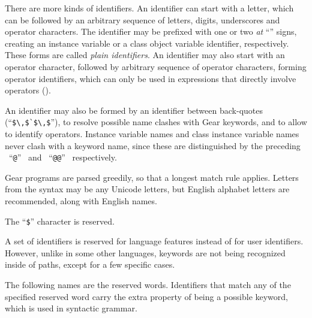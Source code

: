 There are more kinds of identifiers. An identifier can start with a letter, which can be followed by an arbitrary sequence of letters, digits, underscores and operator characters. The identifier may be prefixed with one or two {\em at} ``'' signs, creating an instance variable or a class object variable identifier, respectively. These forms are called {\em plain identifiers}. An identifier may also start with an operator character, followed by arbitrary sequence of operator characters, forming operator identifiers, which can only be used in expressions that directly involve operators (). 

An identifier may also be formed by an identifier between back-quotes (``\lstinline!$\,$`$\,$!''), to resolve possible name clashes with Gear keywords, and to allow to identify operators. Instance variable names and class instance variable names never clash with a keyword name, since these are distinguished by the preceding ~``\lstinline!@!''~ and ~``\lstinline!@@!''~ respectively. 

Gear programs are parsed greedily, so that a longest match rule applies. Letters from the syntax may be any Unicode letters, but English alphabet letters are recommended, along with English names.

The ``\lstinline[mathescape=false]!$!'' character is reserved. 

A set of identifiers is reserved for language features instead of for user identifiers. However, unlike in some other languages, keywords are not being recognized inside of paths, except for a few specific cases.

The following names are the reserved words. Identifiers that match any of the specified reserved word carry the extra property of being a possible keyword, which is used in syntactic grammar. 

